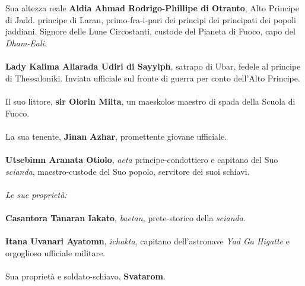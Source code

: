\leavevmode\\
\leavevmode\\
\phantom{123}Sua altezza reale \textbf{Aldia Ahmad Rodrigo-Phillipe di Otranto}, Alto
Principe di Jadd. principe di Laran, primo-fra-i-pari dei principi dei
principati dei popoli jaddiani. Signore delle Lune Circostanti, custode
del Pianeta di Fuoco, capo del \emph{Dham-Eali.}
\leavevmode\\
\leavevmode\\
\phantom{123}\textbf{Lady Kalima Aliarada Udiri di Sayyiph}, satrapo di Ubar, fedele
al principe di Thessaloniki. Inviata ufficiale sul fronte di guerra per
conto dell'Alto Principe.
\leavevmode\\
\leavevmode\\
\phantom{123}Il suo littore, \textbf{sir Olorin Milta}, un maeskolos maestro di spada
della Scuola di Fuoco.
\leavevmode\\
\leavevmode\\
\phantom{123}La sua tenente, \textbf{Jinan Azhar}, promettente giovane ufficiale.
\leavevmode\\
\leavevmode\\
\phantom{123}\textbf{Utsebimn Aranata Otiolo}, \emph{aeta} principe-condottiero e
capitano del Suo \emph{scianda}, maestro-custode del Suo popolo,
servitore dei suoi schiavi.
\leavevmode\\
\leavevmode\\
\textit{Le sue proprietà:}
\leavevmode\\
\leavevmode\\
\phantom{123}\textbf{Casantora Tanaran Iakato}, \emph{baetan,} prete-storico \emph{}
della \emph{scianda}.
\leavevmode\\
\leavevmode\\
\phantom{123}\textbf{Itana Uvanari Ayatomn}, \emph{ichakta}, capitano dell'astronave 
\phantom{123}\emph{Yad Ga Higatte} e orgoglioso ufficiale militare.
\leavevmode\\
\leavevmode\\
\phantom{123}Sua proprietà e soldato-schiavo, \textbf{Svatarom}.

\newpage\blankpage